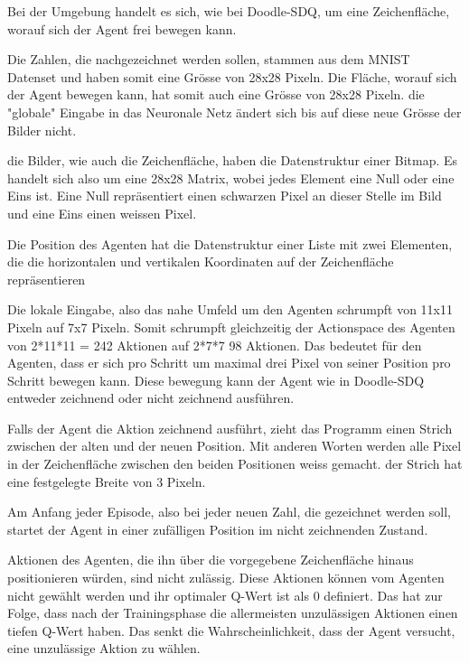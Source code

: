 Bei der Umgebung handelt es sich, wie bei Doodle-SDQ, um eine Zeichenfläche,
worauf sich der Agent frei bewegen kann. 

Die Zahlen, die nachgezeichnet werden sollen, stammen aus dem MNIST Datenset und
haben somit eine Grösse von 28x28 Pixeln. Die Fläche, worauf sich der Agent
bewegen kann, hat somit auch eine Grösse von 28x28 Pixeln. die "globale" Eingabe
in das Neuronale Netz ändert sich bis auf diese neue Grösse der Bilder nicht.

die Bilder, wie auch die Zeichenfläche, haben die Datenstruktur einer Bitmap. Es
handelt sich also um eine 28x28 Matrix, wobei jedes Element eine Null oder eine
Eins ist. Eine Null repräsentiert einen schwarzen Pixel an dieser Stelle im Bild
und eine Eins einen weissen Pixel.

Die Position des Agenten hat die Datenstruktur einer Liste mit zwei Elementen,
die die horizontalen und vertikalen Koordinaten auf der Zeichenfläche
repräsentieren

Die lokale Eingabe, also das nahe Umfeld um den Agenten schrumpft von 11x11
Pixeln auf 7x7 Pixeln. Somit schrumpft gleichzeitig der Actionspace des Agenten
von 2*11*11 = 242 Aktionen auf 2*7*7 98 Aktionen. Das bedeutet für den Agenten,
dass er sich pro Schritt um maximal drei Pixel von seiner Position pro Schritt
bewegen kann. Diese bewegung kann der Agent wie in Doodle-SDQ entweder
zeichnend oder nicht zeichnend ausführen.

Falls der Agent die Aktion zeichnend ausführt, zieht das Programm einen Strich
zwischen der alten und der neuen Position. Mit anderen Worten werden alle Pixel
in der Zeichenfläche zwischen den beiden Positionen weiss gemacht. der Strich
hat eine festgelegte Breite von 3 Pixeln.

Am Anfang jeder Episode, also bei jeder neuen Zahl, die gezeichnet werden soll,
startet der Agent in einer zufälligen Position im nicht zeichnenden Zustand.

Aktionen des Agenten, die ihn über die vorgegebene Zeichenfläche hinaus
positionieren würden, sind nicht zulässig. Diese Aktionen können vom Agenten
nicht gewählt werden und ihr optimaler Q-Wert ist als 0 definiert. Das hat zur
Folge, dass nach der Trainingsphase die allermeisten unzulässigen Aktionen einen
tiefen Q-Wert haben. Das senkt die Wahrscheinlichkeit, dass der Agent versucht,
eine unzulässige Aktion zu wählen.

